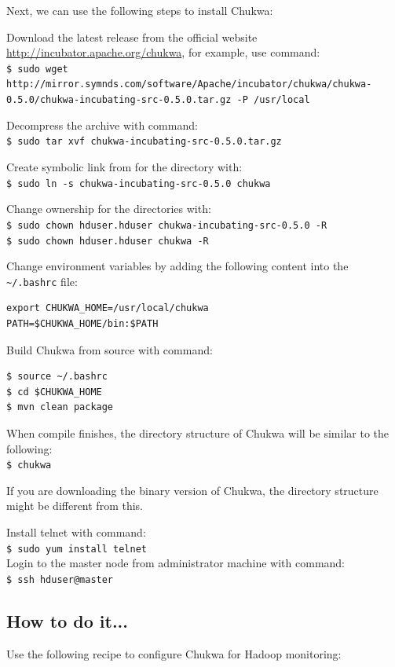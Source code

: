 Next, we can use the following steps to install Chukwa:

Download the latest release from the official website \url{http://incubator.apache.org/chukwa}, for example, use command: \\
\verb|$ sudo wget http://mirror.symnds.com/software/Apache/incubator/chukwa/chukwa-0.5.0/chukwa-incubating-src-0.5.0.tar.gz -P /usr/local|

Decompress the archive with command: \\
\verb|$ sudo tar xvf chukwa-incubating-src-0.5.0.tar.gz|

Create symbolic link from for the directory with: \\
\verb|$ sudo ln -s chukwa-incubating-src-0.5.0 chukwa|

Change ownership for the directories with: \\
\verb|$ sudo chown hduser.hduser chukwa-incubating-src-0.5.0 -R| \\
\verb|$ sudo chown hduser.hduser chukwa -R|

Change environment variables by adding the following content into the \verb|~/.bashrc| file: 
\begin{verbatim}
export CHUKWA_HOME=/usr/local/chukwa
PATH=$CHUKWA_HOME/bin:$PATH
\end{verbatim}

Build Chukwa from source with command: 
\begin{verbatim}
$ source ~/.bashrc
$ cd $CHUKWA_HOME
$ mvn clean package
\end{verbatim}

When compile finishes, the directory structure of Chukwa will be similar to the following:\\
\verb|$ chukwa|


If you are downloading the binary version of Chukwa, the directory structure might be different from this.

Install telnet with command: \\
\verb|$ sudo yum install telnet| \\

Login to the master node from administrator machine with command: \\
\verb|$ ssh hduser@master|

\subsection*{How to do it...}
Use the following recipe to configure Chukwa for Hadoop monitoring:

